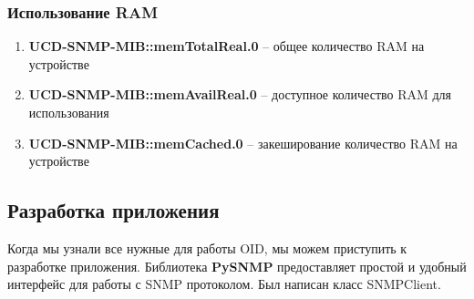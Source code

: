 \subsubsection*{Использование RAM}

\begin{enumerate}
    \item \textbf{UCD-SNMP-MIB::memTotalReal.0} -- общее количество RAM на устройстве
    \item \textbf{UCD-SNMP-MIB::memAvailReal.0} -- доступное количество RAM для использования
    \item \textbf{UCD-SNMP-MIB::memCached.0} -- закеширование количество RAM на устройстве
\end{enumerate}

\subsection*{Разработка приложения}

Когда мы узнали все нужные для работы OID, мы можем приступить к разработке приложения.
Библиотека \textbf{PySNMP} предоставляет простой и удобный интерфейс для работы с SNMP протоколом.
Был написан класс SNMPClient.

